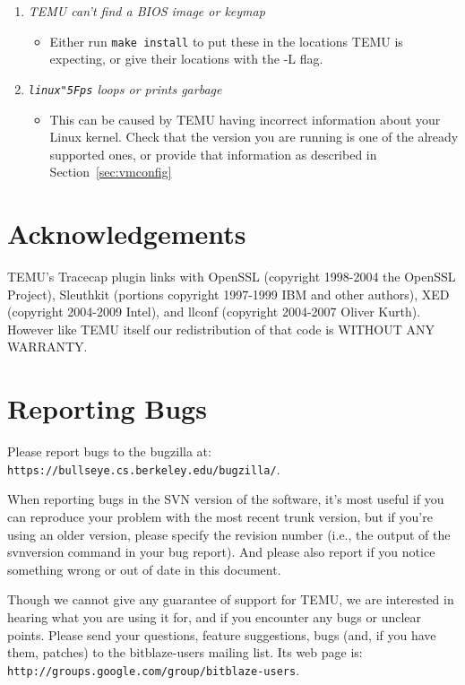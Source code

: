 \documentclass[11pt,onecolumn]{article}
\let\url\nolinkurl %
\def\_{\char"5F}
\begin{document}
\begin {enumerate}
    \begin{itemize}
    \item {These indicate a problem linking with the GNU
        Binutils. Make sure you have matching development and runtime
        versions of its libraries installed, and that {\tt
          /usr/lib/libbfd.so} exists.}
    \end{itemize}
  \item \emph {TEMU can't find a BIOS image or keymap}
    \begin{itemize}
    \item {Either run {\tt make install} to put these in the locations
        TEMU is expecting, or give their locations with the {-L} flag.}
    \end{itemize}
  \item \emph {{\tt linux\_ps} loops or prints garbage}
    \begin{itemize}
    \item {This can be caused by TEMU having incorrect information
        about your Linux kernel. Check that the version you are
        running is one of the already supported ones, or provide that
        information as described in Section~\ref{sec:vmconfig}}
    \end{itemize}
\end {enumerate}

\section {Acknowledgements}

TEMU's Tracecap plugin links with OpenSSL (copyright 1998-2004 the
OpenSSL Project), Sleuthkit (portions copyright 1997-1999 IBM and
other authors), XED (copyright 2004-2009 Intel), and llconf (copyright
2004-2007 Oliver Kurth). However like TEMU itself our redistribution
of that code is WITHOUT ANY WARRANTY.

\section {Reporting Bugs}

\begin{svn}
Please report bugs to the bugzilla at:
\texttt{https://bullseye.cs.berkeley.edu/bugzilla/}.

When reporting bugs in the SVN version of the software, it's most
useful if you can reproduce your problem with the most recent trunk
version, but if you're using an older version, please specify the
revision number (i.e., the output of the svnversion command in your
bug report). And please also report if you notice something wrong or
out of date in this document.
\end{svn}
\begin{release}
Though we cannot give any guarantee of support for TEMU, we are
interested in hearing what you are using it for, and if you encounter
any bugs or unclear points.
%
Please send your questions, feature suggestions, bugs (and, if you
have them, patches) to the bitblaze-users mailing list.
%
Its web page is:
\url{http://groups.google.com/group/bitblaze-users}.
\end{release}
\end{document}
